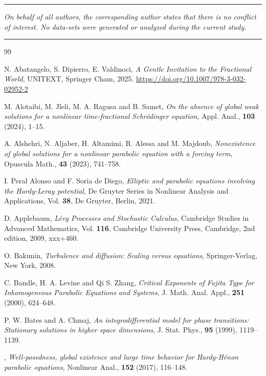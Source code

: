 \documentclass[12pt,reqno]{amsart}
\theoremstyle{plain}
\theoremstyle{definition}
\theoremstyle{remark}
\numberwithin{equation}{section}
\begin{document}
\hrule 

\vspace{0.3cm}
 {\em On behalf of all authors, the corresponding author states that there is no conflict of interest. No data-sets were generated or analyzed during the current study.}
	\vspace{0.3cm}
 \hrule 
\begin{thebibliography}{99}

 N. Abatangelo, S. Dipierro, E. Valdinoci, {\em A Gentle Invitation to the Fractional World}, UNITEXT, Springer Cham, 2025. \url{https://doi.org/10.1007/978-3-032-02952-2}

 {M. Alotaibi, M. Jleli, M. A. Ragusa and B. Samet}, {\em On the absence of global weak solutions for a nonlinear              time-fractional {S}chr\"odinger equation}, {Appl. Anal.}, {\bf 103} ({2024}), {1--15}.

 {A. Alshehri, N. Aljaber, H. Altamimi, R. Alessa and M. Majdoub}, {\em Nonexistence of global solutions for a nonlinear parabolic equation with a forcing term}, {Opuscula Math.}, {\bf 43} (2023), {741--758}.

 I. Peral Alonso and F. Soria de Diego, {\em Elliptic and parabolic equations involving the {Hardy}-{Leray} potential}, {De Gruyter Series in Nonlinear Analysis and Applications}, Vol. {\bf 38}, {De Gruyter, Berlin}, 2021. 

D. Applebaum, {\em Lévy Processes and Stochastic Calculus}, {Cambridge Studies in Advanced Mathematics},
    Vol. {\bf 116}, {Cambridge University Press, Cambridge}, 2nd edition, {2009}, {xxx+460}.



 O. Bakunin, {\em Turbulence and diffusion: Scaling versus equations}, Springer-Verlag, New York, 2008.  



 C. Bandle, H. A. Levine and  Qi S. Zhang, {\em Critical Exponents of Fujita Type for Inhomogeneous Parabolic Equations and Systems}, J. Math. Anal. Appl., {\bf 251} (2000), 624--648.

 P. W. Bates and A. Chmaj, {\em An integrodifferential model for phase transitions: Stationary solutions in higher space dimensions}, J. Stat. Phys., {\bf 95} (1999), 1119--1139. 

, {\em Well-posedness, global existence and large time behavior for Hardy-H\'enon parabolic equations}, Nonlinear Anal., {\bf 152} (2017), 116--148.


\end{thebibliography}
\end{document}
